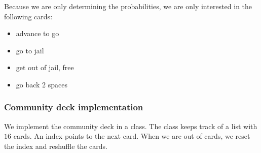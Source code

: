 \documentclass[11pt]{article}
\providecommand{\tightlist}{%
      \setlength{\itemsep}{0pt}\setlength{\parskip}{0pt}}
\begin{document}
    Because we are only determining the probabilities, we are only
interested in the following cards:

\begin{itemize}
\tightlist
\item
  advance to go
\item
  go to jail
\item
  get out of jail, free
\item
  go back 2 spaces
\end{itemize}

    \hypertarget{community-deck-implementation}{%
\newpage
\subsubsection{Community deck
implementation}\label{community-deck-implementation}}

    We implement the community deck in a class. The class keeps track of a
list with \(16\) cards. An index points to the next card. When we are
out of cards, we reset the index and reshuffle the cards.
\end{document}

